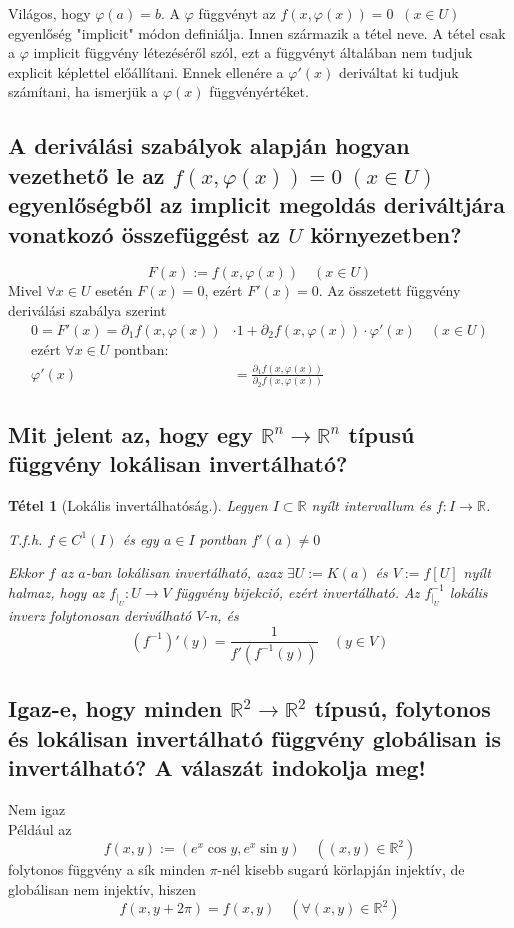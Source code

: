 \documentclass[12pt,a4paper]{article}
\newcommand{\R}{\mathbb{R}}
\newcommand{\f}{\varphi}
\newtheorem{tet}{Tétel}[section]
\begin{document}
Világos, hogy $\f(a) = b$. A $\f$ függvényt az $f(x, \f(x)) = 0 \; \; (x \in U)$ egyenlőség "implicit" módon definiálja. Innen származik a tétel neve.
A tétel csak a $\f$ implicit függvény létezéséről szól, ezt a függvényt általában nem tudjuk explicit képlettel előállítani. Ennek ellenére a $\f'(x)$ deriváltat ki tudjuk számítani, ha ismerjük a $\f(x)$ függvényértéket.
\subsection{A deriválási szabályok alapján hogyan vezethető le az $f(x, \f(x)) = 0 \; (x \in U)$ egyenlőségből az implicit megoldás deriváltjára vonatkozó összefüggést az $U$ környezetben?}
\[
F(x) := f(x,\f(x)) \quad (x \in U)
\]
Mivel $\forall x \in U $  esetén $F(x) = 0$, ezért $F'(x) = 0$. Az összetett függvény deriválási szabálya szerint
\begin{align*}
0 = F'(x) = \partial_1 f (x, \f(x)) &\cdot 1 + \partial_2 f(x,\f(x)) \cdot \f'(x) \quad (x\in U) \\
\text{ezért } \forall x \in U \text{ pontban:} \\
\f'(x) &= \frac{\partial_1 f (x,\f(x))}{\partial_2 f(x,\f(x))}
\end{align*}
\subsection{Mit jelent az, hogy egy $\R^n \rightarrow \R^n$ típusú függvény lokálisan invertálható?}
\begin{tet}[Lokális invertálhatóság.]
Legyen $I \subset \R$ nyílt intervallum és $f : I \rightarrow \R$.

T.f.h. $f \in C^1(I)$ és egy $a \in I$ pontban $f'(a) \neq 0$

Ekkor $f$ az $a$-ban lokálisan invertálható, azaz $\exists U := K(a)$ és $V:= f[U]$ nyílt halmaz, hogy az  $f_{\mid_U} : U \rightarrow V$ függvény bijekció, ezért invertálható. Az $f_{\mid_U}^{-1}$ lokális inverz folytonosan deriválható $V$-n, és
\[
(f^{-1})' (y) = \frac{1}{f'(f^{-1}(y))} \quad (y \in V)
\]
\end{tet}
\subsection{Igaz-e, hogy minden $\R^2 \rightarrow \R^2$ típusú, folytonos és lokálisan invertálható függvény globálisan is invertálható? A válaszát indokolja meg!}
Nem igaz\\
Például az 
\[
f(x,y) := (e^x \cos y, e^x \sin y) \quad ((x,y)\in \R^2)
\]
folytonos függvény a sík minden $\pi$-nél kisebb sugarú körlapján injektív, de globálisan nem injektív, hiszen
\[
f(x,y+2\pi) = f(x,y) \quad (\forall (x,y)\in \R^2)
\]
\end{document}
